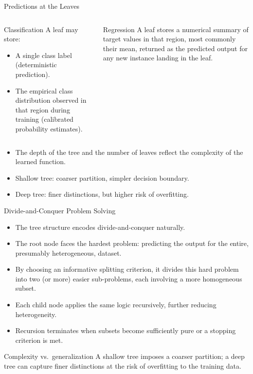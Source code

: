 \begin{frame}{Predictions at the Leaves}
  \begin{columns}[t]
      \begin{block}{Classification}
        A leaf may store:
        \begin{itemize}
          \item A single \alert{class label} (deterministic prediction).
          \item The \alert{empirical class distribution} observed in that region during training
                (calibrated probability estimates).
        \end{itemize}
      \end{block}
      \begin{block}{Regression}
        A leaf stores a \alert{numerical summary} of target values in that region, most
        commonly their \alert{mean}, returned as the predicted output for any new instance
        landing in the leaf.
      \end{block}
  \end{columns}
  \vspace{0.6em}
  \begin{itemize}
    \item The \alert{depth} of the tree and the \alert{number of leaves} reflect the complexity
          of the learned function.
    \item Shallow tree: coarser partition, simpler decision boundary.
    \item Deep tree: finer distinctions, but higher risk of \alert{overfitting}.
  \end{itemize}
\end{frame}

\begin{frame}{Divide-and-Conquer Problem Solving}
  \begin{itemize}
    \item The tree structure encodes \alert{divide-and-conquer} naturally.
    \item The root node faces the hardest problem: predicting the output for the entire,
          presumably heterogeneous, dataset.
    \item By choosing an informative splitting criterion, it divides this hard problem into
          \alert{two (or more) easier sub-problems}, each involving a more homogeneous subset.
    \item Each child node applies the same logic recursively, further reducing heterogeneity.
    \item Recursion terminates when subsets become \alert{sufficiently pure} or a stopping
          criterion is met.
  \end{itemize}
  \begin{alertblock}{Complexity vs.\ generalization}
    A shallow tree imposes a coarser partition; a deep tree can capture finer distinctions
    at the risk of \alert{overfitting} to the training data.
  \end{alertblock}
\end{frame}


